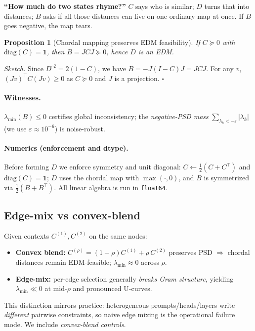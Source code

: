 \documentclass[11pt]{article}
\newtheorem{proposition}{Proposition}
\newcommand{\1}{\mathbf{1}}
\newcommand{\diag}{\mathrm{diag}}
\newcommand{\PSD}{\succeq 0}
\begin{document}
\begin{tcolorbox}[colback=blue!3,colframe=blue!40!black,title=Intuition (for \S\ref{sec:fromCtoB})]
\textbf{``How much do two states rhyme?''} $C$ says who is similar; $D$ turns that into distances; $B$ asks if all those distances can live on one ordinary map at once. If $B$ goes negative, the map tears.
\end{tcolorbox}

\begin{proposition}[Chordal mapping preserves EDM feasibility]
If $C \PSD$ with $\diag(C)=\1$, then $B= JCJ \PSD$, hence $D$ is an EDM.
\end{proposition}
\textit{Sketch.} Since $D^{\circ2}=2(1-C)$, we have $B=-J(I-C)J=JCJ$. For any $v$, $(Jv)^\top C (Jv)\ge 0$ as $C \PSD$ and $J$ is a projection. $\square$

\paragraph{Witnesses.} $\lambda_{\min}(B)\le 0$ certifies global inconsistency; the \emph{negative-PSD mass} $\sum_{\lambda_k<-\varepsilon}|\lambda_k|$ (we use $\varepsilon\!\approx\!10^{-6}$) is noise-robust.

\paragraph{Numerics (enforcement and dtype).} Before forming $D$ we enforce symmetry and unit diagonal: $C\leftarrow \tfrac12(C{+}C^\top)$ and $\diag(C){=}\mathbf{1}$; $D$ uses the chordal map with $\max(\cdot,0)$, and $B$ is symmetrized via $\tfrac12(B{+}B^\top)$. All linear algebra is run in \texttt{float64}.

\subsection{Edge-mix vs convex-blend}\label{sec:mix}
Given contexts $C^{(1)},C^{(2)}$ on the same nodes:
\begin{itemize}[leftmargin=1.5em]
\item \textbf{Convex blend:} $C^{(\rho)}=(1-\rho)C^{(1)}+\rho\,C^{(2)}$ preserves PSD $\Rightarrow$ chordal distances remain EDM-feasible; $\lambda_{\min}\approx 0$ across $\rho$.
\item \textbf{Edge-mix:} per-edge selection generally \emph{breaks Gram structure}, yielding $\lambda_{\min}\ll 0$ at mid-$\rho$ and pronounced U-curves.
\end{itemize}
This distinction mirrors practice: heterogeneous prompts/heads/layers write \emph{different} pairwise constraints, so naive edge mixing is the operational failure mode. We include \emph{convex-blend controls}.
\end{document}
